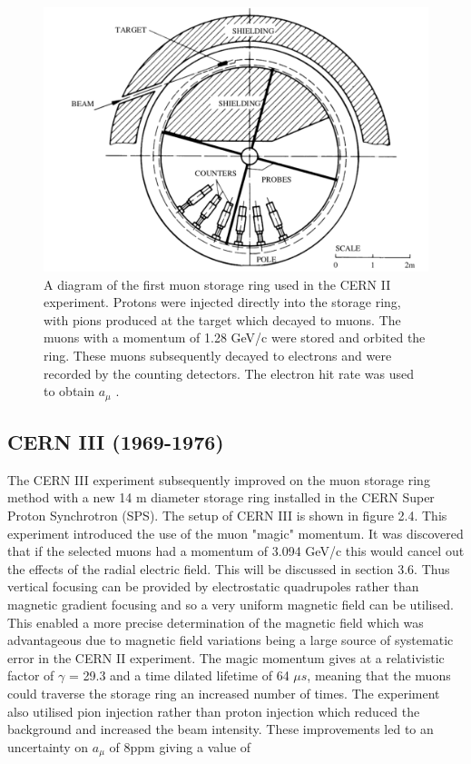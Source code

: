 \begin{figure}[th]
\centering
\includegraphics[scale=0.7]{Figures/cern2}
\decoRule
\caption{A diagram of the first muon storage ring used in the CERN II experiment. Protons were injected directly into the storage ring, with pions produced at the target which decayed to muons. The muons with a momentum of 1.28 GeV/c were stored and orbited the ring. These muons subsequently decayed to electrons and were recorded by the counting detectors. The electron hit rate was used to obtain $a_{\mu}$ \cite{Reference10}.}
\label{fig:cern2}
\end{figure}

\subsection{CERN III (1969-1976)}

The CERN III experiment subsequently improved on the muon storage ring method with a new 14 m diameter storage ring installed in the CERN Super Proton Synchrotron (SPS). The setup of CERN III is shown in figure 2.4. This experiment introduced the use of the muon "magic" momentum. It was discovered that if the selected muons had a momentum of 3.094 GeV/c this would cancel out the effects of the radial electric field. This will be discussed in section 3.6. Thus vertical focusing can be provided by electrostatic quadrupoles rather than magnetic gradient focusing and so a very uniform magnetic field can be utilised. This enabled a more precise determination of the magnetic field which was advantageous due to magnetic field variations being a large source of systematic error in the CERN II experiment. The magic momentum gives at a relativistic factor of $\gamma$ = 29.3 and a time dilated lifetime of 64 $\mu{s}$, meaning that the muons could traverse the storage ring an increased number of times. The experiment also utilised pion injection rather than proton injection which reduced the background and increased the beam intensity. These improvements led to an uncertainty on $a_{\mu}$ of 8ppm giving a value of \cite{Reference10}\cite{Reference12}

